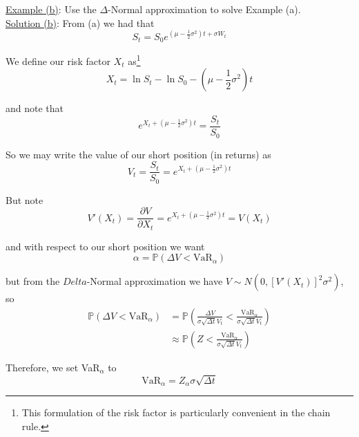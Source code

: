 \documentclass[12pt]{article}
\renewcommand{\P}{\mathbb P}
\begin{document}
\underline{Example (b)}: Use the $\Delta$-Normal approximation to solve Example (a). \\

\underline{Solution (b)}: From (a) we had that
\begin{equation*}
	S_t = S_0 e^{(\mu - \frac{1}{2}\sigma^2)t + \sigma W_t}
\end{equation*}

We define our risk factor $X_t$ as\footnote{This formulation of the risk factor is particularly convenient in the chain rule.}
\begin{equation*}
	X_t = \ln S_t - \ln S_0 - \left( \mu - \frac{1}{2}\sigma^2 \right)t
\end{equation*}

and note that
\begin{equation*}
	e^{X_t + (\mu - \frac{1}{2}\sigma^2)t} = \frac{S_t}{S_0}
\end{equation*}

So we may write the value of our short position (in returns) as
\begin{equation*}
	V_t =  \frac{S_t}{S_0} = e^{X_t + (\mu - \frac{1}{2}\sigma^2)t}
\end{equation*}

But note
\begin{equation*}
	V'(X_t) = \frac{\partial V}{\partial X_t} = e^{X_t + (\mu - \frac{1}{2}\sigma^2)t} = V(X_t)
\end{equation*}

and with respect to our short position we want
\begin{equation*}
	\alpha = \P (\Delta V < \text{VaR}_\alpha)
\end{equation*}

but from the $Delta$-Normal approximation we have $V \sim N \left( 0, [V'(X_t)]^2\sigma^2 \right)$, so
\begin{align*}
	\P (\Delta V < \text{VaR}_\alpha) &= \P \left( \frac{ \Delta V }{ \sigma \sqrt{\Delta t} V_t } < \frac{ \text{VaR}_\alpha }{ \sigma\sqrt{\Delta t}V_t } \right) \\
	&\approx \P \left( Z < \frac{ \text{VaR}_\alpha }{ \sigma\sqrt{\Delta t}V_t } \right)
\end{align*}

Therefore, we set VaR$_\alpha$ to
\begin{equation*}
	\text{VaR}_\alpha = Z_\alpha\sigma\sqrt{\Delta t}
\end{equation*}
\end{document}
